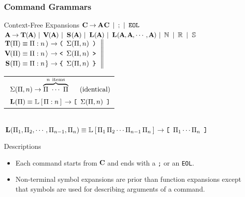 \documentclass[10pt]{beamer}
\begin{document}
\begin{frame}[t] \frametitle{Command Grammars}

	\begin{block}{Context-Free Expansions}
		$\left.\CMD \EXP \ARG \CMD \SEP \,\text{;}\, \SEP \,\texttt{EOL} \right.$ \\ [.24em]
		$\left.\ARG \EXP \TUP(\ARG) \SEP \VCT(\ARG) \SEP \SET(\ARG) \SEP
		 \LST(\ARG) \SEP \LST(\ARG, \ARG, \cdots, \ARG) \SEP \MSN \SEP \MSR \SEP \MSS \right.$ \\ [.27em]
		$\left.\text{%
		\begin{tabular}{@{}l}%
			$\TUP(\Pi) \EQV \Tup{\Pi}{n} \EXP \texttt{\TupBrkL}     \ \, \Sigma(\Pi, n) \ \, \texttt{\TupBrkR}$ \\ [.24em]
			$\VCT(\Pi) \EQV \Vct{\Pi}{n} \EXP \texttt{\VctBrkTextL} \ \, \Sigma(\Pi, n) \ \, \texttt{\VctBrkTextR}$ \\ [.24em]
			$\SET(\Pi) \EQV \Set{\Pi}{n} \EXP \texttt{\SetBrkL}     \ \, \Sigma(\Pi, n) \ \, \texttt{\SetBrkR}$
		\end{tabular}} \right\|\kern.128em$%
		\begin{tabular}{@{}l}%
			$\ \Sigma(\Pi, n) \rightarrow \overbrace{\Pi \ \cdots \ \Pi}^{n \ \text{items}} \quad\,\ \text{(identical)}$ \\ [.43em]
			$\ \LST(\Pi) \EQV \Lst{\Pi}{n} \EXP \texttt{\LstBrkL} \ \, \Sigma(\Pi, n) \ \, \texttt{\LstBrkR}$
		\end{tabular} \\ [.24em]
		$\left.\LST(\Pi_1,\Pi_2,\cdots,\Pi_{n-1},\Pi_n) \EQV \LstFull{\Pi_1\,\Pi_2\cdots\Pi_{n-1}\,\Pi_n} \EXP
		 \texttt{\LstBrkL} \ \, \Pi_1\cdots\Pi_n \ \, \texttt{\LstBrkR}\right.$
	\end{block}

	\begin{block}{Descriptions}
		\begin{itemize}
			\item Each command starts from $\CMD$ and ends with a \texttt{;} or an \texttt{EOL}.
			\item Non-terminal symbol expansions are prior than function expansions except that symbols are used for describing arguments of a command.
		\end{itemize}
	\end{block}

\end{frame}
\end{document}
